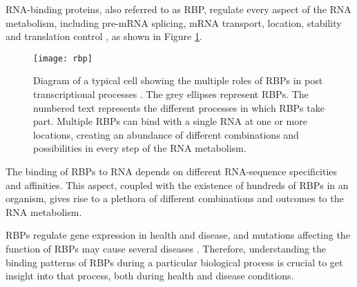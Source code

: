 RNA-binding proteins, also referred to as RBP, regulate every aspect of the RNA
metabolism, including pre-mRNA splicing, mRNA transport, location, stability and
translation control \cite{Cooper2009777, Muller-McNicoll2013, Sonenberg2007721,
Sonenberg2009731}, as shown in Figure \ref{fig:rbp}.

\begin{figure}[!htb]
  \begin{center}
    \leavevmode
    \texttt{[image: rbp]}
    \caption[Role of RBPs in the RNA metabolism process]{
      Diagram of a typical cell showing the multiple roles of RBPs in post
      transcriptional processes \cite{janga2011construction}. The grey ellipses
      represent RBPs. The numbered text represents the different processes in
      which RBPs take part. Multiple RBPs can bind with a single RNA at one or
      more locations, creating an abundance of different combinations and
      possibilities in every step of the RNA metabolism.
    }
    \label{fig:rbp}
  \end{center}
\end{figure}

The binding of RBPs to RNA depends on different RNA-sequence specificities and
affinities. This aspect, coupled with the existence of hundreds of RBPs in an
organism, gives rise to a plethora of different combinations and outcomes to the
RNA metabolism.

RBPs regulate gene expression in health and disease, and mutations affecting the
function of RBPs may cause several diseases \cite{Cooper2009777}. Therefore,
understanding the binding patterns of RBPs during a particular biological
process is crucial to get insight into that process, both during health and
disease conditions.

